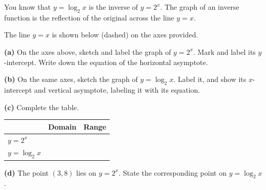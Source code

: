 \documentclass[12pt, twoside]{article}
\begin{document}
\begin{enumerate}[itemsep=0.5cm]
You know that $y = \log_2 x$ is the inverse of $y = 2^x$. The graph of an
inverse function is the reflection of the original across the line $y = x$.

The line $y = x$ is shown below (dashed) on the axes provided.

\begin{center}
\end{center}

\textbf{(a)} On the axes above, sketch and label the graph of $y = 2^x$. Mark and label its $y$-intercept. Write down the equation of the horizontal asymptote.

\textbf{(b)} On the same axes, sketch the graph of $y = \log_2 x$. Label
it, and show its $x$-intercept and vertical asymptote, labeling it with its equation.

\textbf{(c)} Complete the table.

\vspace{0.3cm}

\begin{center}
\renewcommand{\arraystretch}{1.8}
\begin{tabular}{| l | c | c |}
\hline
 & Domain & Range \\
\hline
$y = 2^x$ & \hspace{4cm} & \hspace{4cm} \\
\hline
$y = \log_2 x$ & & \\
\hline
\end{tabular}
\end{center}

\vspace{0.4cm}

\textbf{(d)} The point $(3, 8)$ lies on $y = 2^x$. State the corresponding
point on $y = \log_2 x$.

\vspace{1.5cm}


\end{enumerate}
\end{document}
